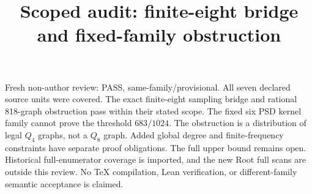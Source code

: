 \documentclass{article}
\begin{document}
\title{Scoped audit: finite-eight bridge and fixed-family obstruction}\maketitle
Fresh non-author review: PASS, same-family/provisional. All seven declared source units were covered. The exact finite-eight sampling bridge and rational 818-graph obstruction pass within their stated scope. The fixed six PSD kernel family cannot prove the threshold $683/1024$. The obstruction is a distribution of legal $Q_4$ graphs, not a $Q_8$ graph. Added global degree and finite-frequency constraints have separate proof obligations. The full upper bound remains open. Historical full-enumerator coverage is imported, and the new Root full scans are outside this review. No TeX compilation, Lean verification, or different-family semantic acceptance is claimed.
\end{document}
